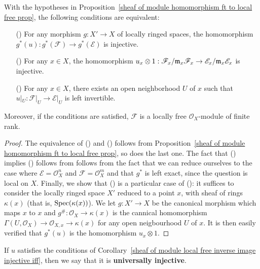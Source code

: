 \begin{corollary}\label{sheaf of module local free inverse image injective iff}
With the hypotheses in Proposition~\ref{sheaf of module homomorphism ft to local free prop}, the following conditions are equivalent:
\begin{itemize}
\item[(\rmnum{1})] For any morphism $g:X'\to X$ of locally ringed spaces, the homomorphism $g^*(u):g^*(\mathscr{F})\to g^*(\mathscr{E})$ is injective.
\item[(\rmnum{2})] For any $x\in X$, the homomorphism $u_x\otimes 1:\mathscr{F}_x/\mathfrak{m}_x\mathscr{F}_x\to\mathscr{E}_x/\mathfrak{m}_x\mathscr{E}_x$ is injective.
\item[(\rmnum{3})] For any $x\in X$, there exists an open neighborhood $U$ of $x$ such that $u|_U:\mathscr{F}|_U\to\mathscr{E}|_U$ is left invertible.
\end{itemize}
Moreover, if the conditions are satisfied, $\mathscr{F}$ is a locally free $\mathscr{O}_X$-module of finite rank.
\end{corollary}
\begin{proof}
The equivalence of () and () follows from Proposition~\ref{sheaf of module homomorphism ft to local free prop}, so does the last one. The fact that () implies () follows from follows from the fact that we can reduce ourselves to the case where $\mathscr{E}=\mathscr{O}_X^n$ and $\mathscr{F}=\mathscr{O}_X^m$ and that $g^*$ is left exact, since the question is local on $X$. Finally, we show that () is a particular case of (): it suffices to consider the locally ringed space $X'$ reduced to a point $x$, with sheaf of rings $\kappa(x)$ (that is, $\mathrm{Spec}(\kappa(x))$). We let $g:X'\to X$ be the canonical morphism which maps $x$ to $x$ and $g^{\#}:\mathscr{O}_X\to\kappa(x)$ is the cannical homomorphism $\Gamma(U,\mathscr{O}_X)\to\mathscr{O}_{X,x}\to\kappa(x)$ for any open neigbourhood $U$ of $x$. It is then easily verified that $g^*(u)$ is the homomorphism $u_x\otimes 1$. 
\end{proof}
\begin{remark}
If $u$ satisfies the conditions of Corollary~\ref{sheaf of module local free inverse image injective iff}, then we say that it is \textbf{universally injective}.
\end{remark}
